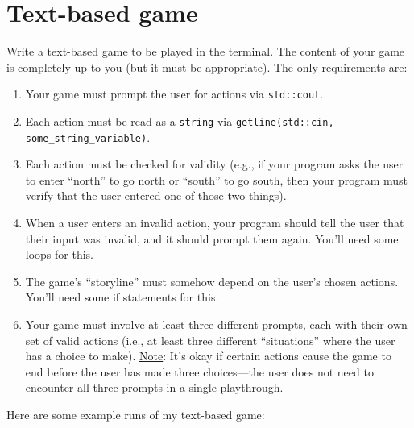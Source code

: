 \documentclass{article}
\begin{document}
\section{Text-based game}

Write a text-based game to be played in the terminal. The content of your game is completely up to you (but it must be appropriate). The only requirements are:

\begin{enumerate}
    \item Your game must prompt the user for actions via \texttt{std::cout}.
    \item Each action must be read as a \texttt{string} via \texttt{getline(std::cin, some\_string\_variable)}.
    \item Each action must be checked for validity (e.g., if your program asks the user to enter ``north'' to go north or ``south'' to go south, then your program must verify that the user entered one of those two things).
    \item When a user enters an invalid action, your program should tell the user that their input was invalid, and it should prompt them again. You'll need some loops for this.
    \item The game's ``storyline'' must somehow depend on the user's chosen actions. You'll need some if statements for this.
    \item Your game must involve \underline{at least three} different prompts, each with their own set of valid actions (i.e., at least three different ``situations'' where the user has a choice to make). \underline{Note}: It's okay if certain actions cause the game to end before the user has made three choices---the user does not need to encounter all three prompts in a single playthrough.
\end{enumerate}

Here are some example runs of my text-based game:
\end{document}
